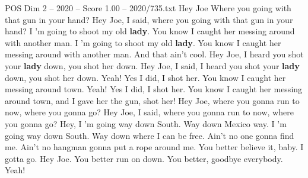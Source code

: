 \begin{textsample}{POS Dim 2 – 2020 – Score 1.00 – 2020/735.txt}  \label{ex:f2_pos_022}
Hey Joe Where you going with that gun in your hand?
Hey Joe, I said, where you going with that gun in your hand?
I 'm going to shoot my old \textbf{lady}.
You know I caught her messing around with another man.
I 'm going to shoot my old \textbf{lady}.
You know I caught her messing around with another man.
And that ain't cool.
Hey Joe, I heard you shot your \textbf{lady} down, you shot her down.
Hey Joe, I said, I heard you shot your \textbf{lady} down, you shot her down.
Yeah!
Yes I did, I shot her.
You know I caught her messing around town.
Yeah!
Yes I did, I shot her.
You know I caught her messing around town, and I gave her the gun, shot her!
Hey Joe, where you gonna run to now, where you gonna go?
Hey Joe, I said, where you gonna run to now, where you gonna go?
Hey, I 'm going way down South.
Way down Mexico way.
I 'm going way down South.
Way down where I can be free.
Ain't no one gonna find me.
Ain't no hangman gonna put a rope around me.
You better believe it, baby.
I gotta go.
Hey Joe.
You better run on down.
You better, goodbye everybody.
Yeah!

\end{textsample}
